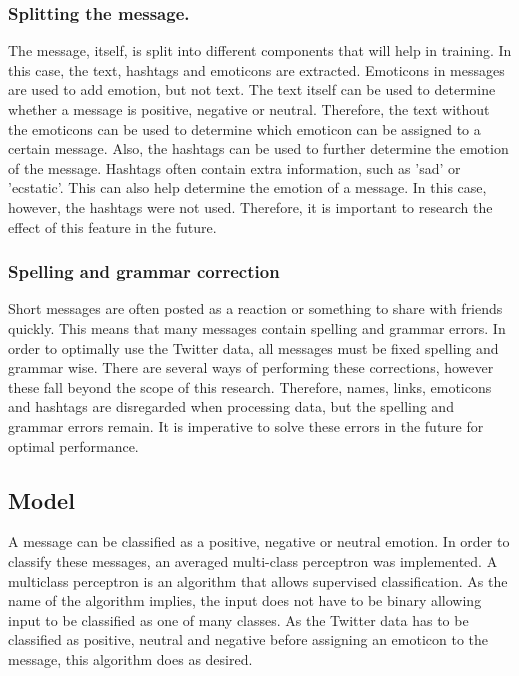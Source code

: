 \documentclass{article} %
\begin{document}
\subsubsection*{Splitting the message.}
The message, itself, is split into different components that will help in training. In this case, the text, hashtags and emoticons are extracted. Emoticons in messages are used to add emotion, but not text. The text itself can be used to determine whether a message is positive, negative or neutral. Therefore, the text without the emoticons can be used to determine which emoticon can be assigned to a certain message. Also, the hashtags can be used to further determine the emotion of the message. Hashtags often contain extra information, such as 'sad' or 'ecstatic'. This can also help determine the emotion of a message. In this case, however, the hashtags were not used. Therefore, it is important to research the effect of this feature in the future. 

\subsubsection*{Spelling and grammar correction}
Short messages are often posted as a reaction or something to share with friends quickly. This means that many messages contain spelling and grammar errors. In order to optimally use the Twitter data, all messages must be fixed spelling and grammar wise. There are several ways of performing these corrections, however these fall beyond the scope of this research. Therefore, names, links, emoticons and hashtags are disregarded when processing data, but the spelling and grammar errors remain. It is imperative to solve these errors in the future for optimal performance.




\subsection{Model}


A message can be classified as a positive, negative or neutral emotion. In order to classify these messages, an averaged multi-class perceptron was implemented. A multiclass perceptron is an algorithm that allows supervised classification. As the name of the algorithm implies, the input does not have to be binary allowing input to be classified as one of many classes. As the Twitter data has to be classified as positive, neutral and negative before assigning an emoticon to the message, this algorithm does as desired. 
\end{document}
